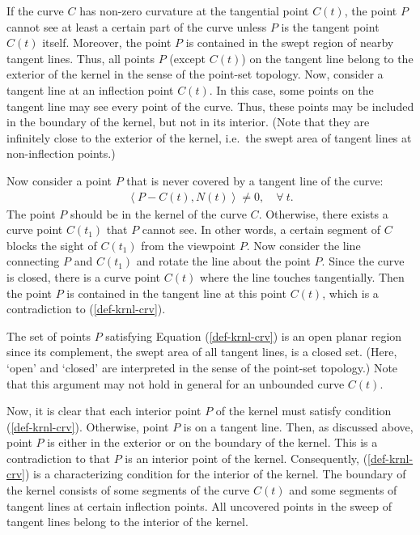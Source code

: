 \documentclass[twoside]{article}
\newcommand{\inner}[2]{\left<{#1}, {#2} \right>}
\begin{document}
If the curve $C$ has non-zero curvature at the tangential point $C(t)$,
the point $P$ cannot see at least a certain part of the curve
unless $P$ is the tangent point $C(t)$ itself.
%
%
%
Moreover, the point $P$ is contained in the swept region of nearby tangent lines.
Thus, all points $P$ (except $C(t)$) on the tangent line belong to
the exterior of the kernel in the sense of the point-set topology.
Now, consider a tangent line at an inflection point $C(t)$.
In this case, some points on the tangent line may see
every point of the curve.  Thus, these points may be included
in the boundary of the kernel, but not in its interior.
(Note that they are infinitely close to the exterior of the kernel,
i.e.~the swept area of tangent lines at non-inflection points.)

Now consider a point $P$ that is never covered by a tangent line
of the curve:
\begin{eqnarray}
\inner{P - C(t)}{N(t)} \neq 0,\quad \forall\ t.
\label{def-krnl-crv}
\end{eqnarray}
The point $P$ should be in the kernel of the curve $C$.
Otherwise, there exists a curve point $C(t_1)$ that $P$ cannot see.
In other words, a certain segment of $C$ blocks the sight of $C(t_1)$
from the viewpoint $P$.  Now consider the line connecting $P$ and
$C(t_1)$ and rotate the line about the point $P$.  Since the curve
is closed, there is a curve point $C(t)$ where the line touches
tangentially.  Then the point $P$ is contained in the tangent line
at this point $C(t)$, which is a contradiction to (\ref{def-krnl-crv}).

The set of points $P$ satisfying Equation (\ref{def-krnl-crv}) is
an open planar region since its complement, the swept area of
all tangent lines, is a closed set.  (Here, `open' and `closed'
are interpreted in the sense of the point-set topology.)
Note that this argument may not hold in general
for an unbounded curve $C(t)$.

Now, it is clear that each interior point $P$ of the kernel 
must satisfy condition (\ref{def-krnl-crv}).
Otherwise, point $P$ is on a tangent line.
%
%
%
Then, as discussed above, point $P$ is either in the exterior
or on the boundary of the kernel.
This is a contradiction to that $P$ is an interior point of the kernel.
Consequently, (\ref{def-krnl-crv}) is a characterizing condition
for the interior of the kernel.  The boundary of the kernel
consists of some segments of the curve $C(t)$ and some segments
of tangent lines at certain inflection points.  All uncovered points
in the sweep of tangent lines belong to the interior of the kernel.
 
\end{document}

